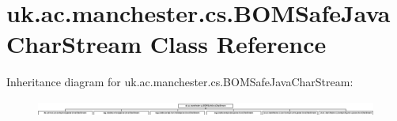 \hypertarget{classuk_1_1ac_1_1manchester_1_1cs_1_1_b_o_m_safe_java_char_stream}{\section{uk.\-ac.\-manchester.\-cs.\-B\-O\-M\-Safe\-Java\-Char\-Stream Class Reference}
\label{classuk_1_1ac_1_1manchester_1_1cs_1_1_b_o_m_safe_java_char_stream}
}
Inheritance diagram for uk.\-ac.\-manchester.\-cs.\-B\-O\-M\-Safe\-Java\-Char\-Stream\-:\begin{figure}[H]
\begin{center}
\leavevmode
\includegraphics[height=0.501792cm]{classuk_1_1ac_1_1manchester_1_1cs_1_1_b_o_m_safe_java_char_stream}
\end{center}
\end{figure}
